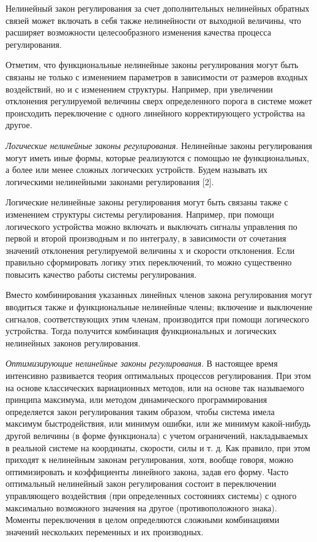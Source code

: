 Нелинейный закон регулирования за счет дополнительных нелинейных обратных связей может включать в себя также нелинейности от выходной величины, что расширяет возможности целесообразного изменения качества процесса регулирования.

Отметим, что функциональные нелинейные законы регулирования могут быть связаны не только с изменением параметров в зависимости от размеров входных воздействий, но и с изменением структуры. Например, при увеличении отклонения регулируемой величины сверх определенного порога в системе может происходить переключение с одного линейного корректирующего устройства на другое.

\textit{Логические нелинейные законы регулирования}. Нелинейные законы регулирования могут иметь иные формы, которые реализуются с помощью не функциональных, а более или менее сложных логических устройств. Будем называть их логическими нелинейными законами регулирования [2].

Логические нелинейные законы регулирования могут быть связаны также с изменением структуры системы регулирования. Например, при помощи логического устройства можно включать и выключать сигналы управления по первой и второй производным и по интегралу, в зависимости от сочетания значений отклонения регулируемой величины х и скорости отклонения. Если правильно сформировать логику этих переключений, то можно существенно повысить качество работы системы регулирования.

Вместо комбинирования указанных линейных членов закона регулирования могут вводиться также и функциональные нелинейные члены; включение и выключение сигналов, соответствующих этим членам, производится при помощи логического устройства. Тогда получится комбинация функциональных и логических нелинейных законов регулирования.

\textit{Оптимизирующие нелинейные законы регулирования}. В настоящее время интенсивно развивается теория оптимальных процессов регулирования. При этом на основе классических вариационных методов, или на основе так называемого принципа максимума, или методом динамического программирования определяется закон регулирования таким образом, чтобы система имела максимум быстродействия, или минимум ошибки, или же минимум какой-нибудь другой величины (в форме функционала) с учетом ограничений, накладываемых в реальной системе на координаты, скорости, силы и т. д. Как правило, при этом приходят к нелинейным законам регулирования, хотя, вообще говоря, можно оптимизировать и коэффициенты линейного закона, задав его форму. Часто оптимальный нелинейный закон регулирования состоит в переключении управляющего воздействия (при определенных состояниях системы) с одного максимально возможного значения на другое (противоположного знака). Моменты переключения в целом определяются сложными комбинациями значений нескольких переменных и их производных.

